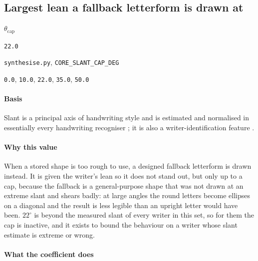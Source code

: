 \subsection{Largest lean a fallback letterform is drawn at}

\label{coef:core-slant-cap}

\begin{description}[leftmargin=5.2em,style=sameline]

\item[Symbol] $\theta_{\text{cap}}$

\item[Value] \texttt{22.0}

\item[Source] \texttt{synthesise.py}, \texttt{CORE\_SLANT\_CAP\_DEG}

\item[Swept] \texttt{0.0}, \texttt{10.0}, \texttt{22.0}, \texttt{35.0}, \texttt{50.0}

\end{description}

\paragraph{Basis}

Slant is a principal axis of handwriting style and is estimated and normalised in essentially every handwriting recogniser \cite{vinciarelli2001}; it is also a writer-identification feature \cite{bulacu2007}.

\paragraph{Why this value}

When a stored shape is too rough to use, a designed fallback letterform is drawn instead. It is given the writer's lean so it does not stand out, but only up to a cap, because the fallback is a general-purpose shape that was not drawn at an extreme slant and shears badly: at large angles the round letters become ellipses on a diagonal and the result is less legible than an upright letter would have been. $22^\circ$ is beyond the measured slant of every writer in this set, so for them the cap is inactive, and it exists to bound the behaviour on a writer whose slant estimate is extreme or wrong.

\paragraph{What the coefficient does}

